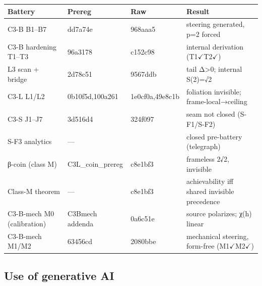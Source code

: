 \documentclass[
  11pt]{article}
\newcounter{none} %
\begin{document}
{\def\LTcaptype{none} %
\begin{longtable}[]{@{}
  >{\raggedright\arraybackslash}p{}
  >{\raggedright\arraybackslash}p{}
  >{\raggedright\arraybackslash}p{}
  >{\raggedright\arraybackslash}p{}@{}}
\toprule\noalign{}
\begin{minipage}[b]{\linewidth}\raggedright
Battery
\end{minipage} & \begin{minipage}[b]{\linewidth}\raggedright
Prereg
\end{minipage} & \begin{minipage}[b]{\linewidth}\raggedright
Raw
\end{minipage} & \begin{minipage}[b]{\linewidth}\raggedright
Result
\end{minipage} \\
\midrule\noalign{}
\endhead
\bottomrule\noalign{}
\endlastfoot
C3-B B1--B7 & dd7a74e & 968aaa5 & steering generated, p=2 forced \\
C3-B hardening T1--T3 & 96a3178 & c152c98 & internal derivation
(T1\(\checkmark\)T2\(\checkmark\)) \\
L3 scan + bridge & 2d78c51 & 9567ddb & tail Δ\textgreater0; internal
S(2)=√2 \\
C3-L L1/L2 & 0b10f5d,100a261 & 1e0cf0a,49e8c1b & foliation invisible;
frame-local→ceiling \\
C3-S J1--J7 & 3d516d4 & 324f097 & seam not closed (S-F1/S-F2) \\
S-F3 analytics & --- & 2053106 & closed pre-battery (telegraph) \\
β-coin (class M) & C3L\_coin\_prereg & c8e1bf3 & frameless 2√2,
invisible \\
Class-M theorem & --- & c8e1bf3 & achievability iff shared invisible
precedence \\
C3-B-mech M0 (calibration) & C3Bmech addenda & 0a6c51e & source
polarizes; χ(h) linear \\
C3-B-mech M1/M2 & 63456cd & 2080bbe & mechanical steering, form-free
(M1\(\checkmark\)M2\(\checkmark\)) \\
\end{longtable}
}

\subsection{Use of generative AI}\label{use-of-generative-ai}
\end{document}
